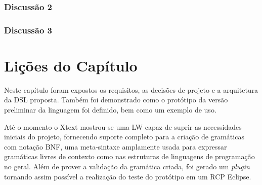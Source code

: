 \subsubsection{Discussão 2}

\subsubsection{Discussão 3}





\section{Lições do Capítulo} \label{sec:licDSL}

Neste capítulo foram expostos os requisitos, as decisões de projeto e a arquitetura da \ac{DSL} proposta. 
Também foi demonstrado como o protótipo da versão preliminar da linguagem foi definido, bem como um exemplo de uso.

Até o momento o Xtext mostrou-se uma \ac{LW} capaz de suprir as necessidades iniciais do projeto, fornecendo suporte completo para a criação de gramáticas com notação \ac{BNF}, uma meta-sintaxe amplamente usada para expressar gramáticas livres de contexto como nas estruturas de linguagens de programação no geral. 
Além de prover a validação da gramática criada, foi gerado um \textit{plugin} tornando assim possível a realização do teste do protótipo em um \ac{RCP} Eclipse. 

